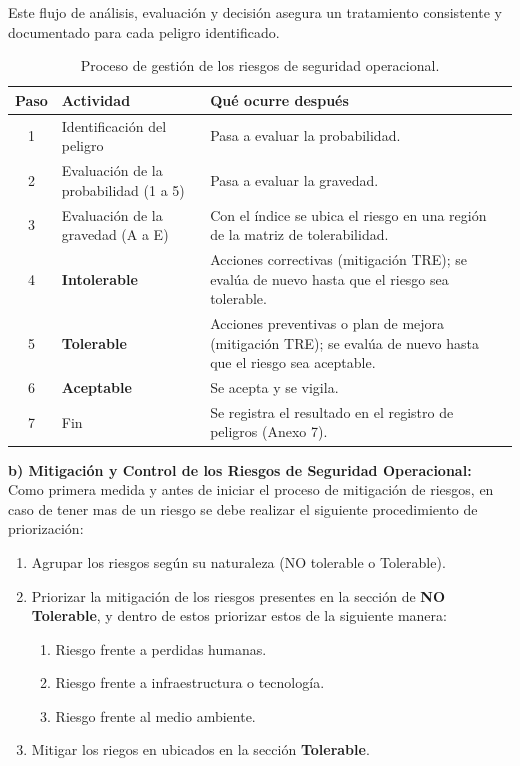 Este flujo de análisis, evaluación y decisión asegura un tratamiento consistente y documentado para cada peligro identificado.

\begin{table}[H]
\centering
\renewcommand{\arraystretch}{1.35}
\begin{tabularx}{\textwidth}{|c|>{\RaggedRight\arraybackslash}p{4.2cm}|>{\RaggedRight\arraybackslash}X|}
\hline
\rowcolor[gray]{0.9}\textbf{Paso} & \textbf{Actividad} & \textbf{Qué ocurre después} \\ \hline
1 & Identificación del peligro & Pasa a evaluar la probabilidad. \\ \hline
2 & Evaluación de la probabilidad (1 a 5) & Pasa a evaluar la gravedad. \\ \hline
3 & Evaluación de la gravedad (A a E) & Con el índice se ubica el riesgo en una región de la matriz de tolerabilidad. \\ \hline
4 & \cellcolor[HTML]{FF4B4B}\textbf{Intolerable} & Acciones correctivas (mitigación TRE); se evalúa de nuevo hasta que el riesgo sea tolerable. \\ \hline
5 & \cellcolor[HTML]{FFE04D}\textbf{Tolerable} & Acciones preventivas o plan de mejora (mitigación TRE); se evalúa de nuevo hasta que el riesgo sea aceptable. \\ \hline
6 & \cellcolor[HTML]{3DBE6B}\textbf{Aceptable} & Se acepta y se vigila. \\ \hline
7 & Fin & Se registra el resultado en el registro de peligros (Anexo 7). \\ \hline
\end{tabularx}
\caption{Proceso de gestión de los riesgos de seguridad operacional.}
\end{table}


\textbf{b) Mitigación y Control de los Riesgos de Seguridad Operacional:}\\

Como primera medida y antes de iniciar el proceso de mitigación de riesgos, en caso de tener mas de un riesgo se debe realizar el siguiente procedimiento de priorización:

\begin{enumerate}
    \item Agrupar los riesgos según su naturaleza (NO tolerable o Tolerable).
    \item Priorizar la mitigación de los riesgos presentes en la sección de \textbf{NO Tolerable}, y dentro de estos priorizar estos de la siguiente manera:
    \begin{enumerate}
        \item Riesgo frente a perdidas humanas. 
        \item Riesgo frente a infraestructura o tecnología.
        \item Riesgo frente al medio ambiente.
    \end{enumerate}
    \item Mitigar los riegos en ubicados en la sección \textbf{Tolerable}.
\end{enumerate}

